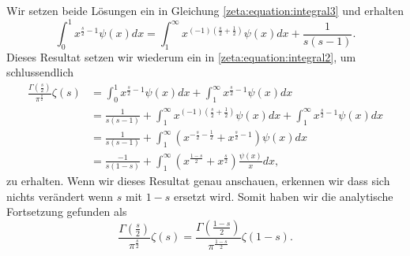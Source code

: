 Wir setzen beide Lösungen ein in Gleichung \eqref{zeta:equation:integral3} und erhalten
\begin{equation}
    \int_0^{1}
    x^{\frac{s}{2}-1}
    \psi(x)
    dx
    =
    \int_{1}^{\infty}
    x^{(-1) \left(\frac{s}{2}+\frac{1}{2}\right)}
    \psi(x)
    dx
    +
    \frac{1}{s(s-1)}.
\end{equation}
Dieses Resultat setzen wir wiederum ein in \eqref{zeta:equation:integral2}, um schlussendlich
\begin{align}
    \frac{\Gamma \left( \frac{s}{2} \right)}{\pi^{\frac{s}{2}}}
    \zeta(s)
    &=
    \int_0^{1}
    x^{\frac{s}{2}-1}
    \psi(x)
    dx
    +
    \int_1^{\infty}
    x^{\frac{s}{2}-1}
    \psi(x)
    dx
    \nonumber
    \\
    &=
    \frac{1}{s(s-1)}
    +
    \int_{1}^{\infty}
    x^{(-1) \left(\frac{s}{2}+\frac{1}{2}\right)}
    \psi(x)
    dx
    +
    \int_1^{\infty}
    x^{\frac{s}{2}-1}
    \psi(x)
    dx
    \\
    &=
    \frac{1}{s(s-1)}
    +
    \int_{1}^{\infty}
    \left(
    x^{-\frac{s}{2}-\frac{1}{2}}
    +
    x^{\frac{s}{2}-1}
    \right)
    \psi(x)
    dx
    \\
    &=
    \frac{-1}{s(1-s)}
    +
    \int_{1}^{\infty}
    \left(
    x^{\frac{1-s}{2}}
    +
    x^{\frac{s}{2}}
    \right)
    \frac{\psi(x)}{x}
    dx,
\end{align}
zu erhalten.
Wenn wir dieses Resultat genau anschauen, erkennen wir dass sich nichts verändert wenn $s$ mit $1-s$ ersetzt wird.
Somit haben wir die analytische Fortsetzung gefunden als
\begin{equation}\label{zeta:equation:functional}
    \frac{\Gamma \left( \frac{s}{2} \right)}{\pi^{\frac{s}{2}}}
    \zeta(s)
    =
    \frac{\Gamma \left( \frac{1-s}{2} \right)}{\pi^{\frac{1-s}{2}}}
    \zeta(1-s).
\end{equation}


